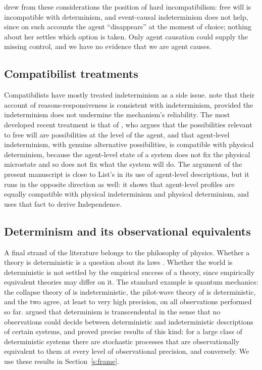 \documentclass{situationist-preprint}
\begin{document}
\citet{Pereboom2001,Pereboom2014} drew from these considerations the position of hard incompatibilism: free will is incompatible with determinism, and event-causal indeterminism does not help, since on such accounts the agent \enquote{disappears} at the moment of choice; nothing about her settles which option is taken. Only agent causation could supply the missing control, and we have no evidence that we are agent causes.

\subsection{Compatibilist treatments}

Compatibilists have mostly treated indeterminism as a side issue. \citet{FischerRavizza1998} note that their account of reasons-responsiveness is consistent with indeterminism, provided the indeterminism does not undermine the mechanism's reliability. The most developed recent treatment is that of \citet{List2014,List2019}, who argues that the possibilities relevant to free will are possibilities at the level of the agent, and that agent-level indeterminism, with genuine alternative possibilities, is compatible with physical determinism, because the agent-level state of a system does not fix the physical microstate and so does not fix what the system will do. The argument of the present manuscript is close to List's in its use of agent-level descriptions, but it runs in the opposite direction as well: it shows that agent-level profiles are equally compatible with physical indeterminism and physical determinism, and uses that fact to derive Independence.

\subsection{Determinism and its observational equivalents}

A final strand of the literature belongs to the philosophy of physics. Whether a theory is deterministic is a question about its laws \citep{Earman1986}. Whether the world is deterministic is not settled by the empirical success of a theory, since empirically equivalent theories may differ on it. The standard example is quantum mechanics: the collapse theory of \citet{GRW1986} is indeterministic, the pilot-wave theory of \citet{Bohm1952} is deterministic, and the two agree, at least to very high precision, on all observations performed so far. \citet{Suppes1993} argued that determinism is transcendental in the sense that no observations could decide between deterministic and indeterministic descriptions of certain systems, and \citet{Werndl2009} proved precise results of this kind: for a large class of deterministic systems there are stochastic processes that are observationally equivalent to them at every level of observational precision, and conversely. We use these results in Section~\ref{s:frame}.
\end{document}
